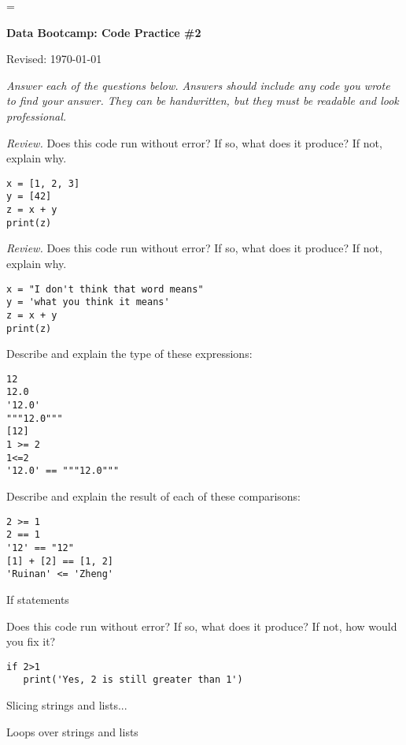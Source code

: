 \documentclass[11pt]{exam}
\begin{document}
\parskip=\bigskipamount
\parindent=0.0in
\thispagestyle{empty}


\bigskip\bigskip
\centerline{\Large \bf Data Bootcamp:  Code Practice \#2}
\centerline{Revised: \today}

{\it Answer each of the questions below.
Answers should include any code you wrote to find your answer.
They can be handwritten, but they must be readable and look professional.}

\begin{questions}
\item {\it Review.\/}
Does this code run without error?  If so, what does it produce?  If not, explain why.
\begin{verbatim}
x = [1, 2, 3]
y = [42]
z = x + y
print(z)
\end{verbatim}

\item {\it Review.\/}
Does this code run without error?  If so, what does it produce?  If not, explain why.
\begin{verbatim}
x = "I don't think that word means"
y = 'what you think it means'
z = x + y
print(z)
\end{verbatim}


\item Describe and explain the type of these expressions:
\begin{verbatim}
12
12.0
'12.0'
"""12.0"""
[12]
1 >= 2
1<=2
'12.0' == """12.0"""
\end{verbatim}


\item Describe and explain the result of each of these comparisons:
\begin{verbatim}
2 >= 1
2 == 1
'12' == "12"
[1] + [2] == [1, 2]
'Ruinan' <= 'Zheng'
\end{verbatim}


\item If statements


\item
Does this code run without error?  If so, what does it produce?  If not, how would you fix it?
\begin{verbatim}
if 2>1
   print('Yes, 2 is still greater than 1')
\end{verbatim}


\item Slicing strings and lists...


\item Loops over strings and lists


\end{questions}
\end{document}
